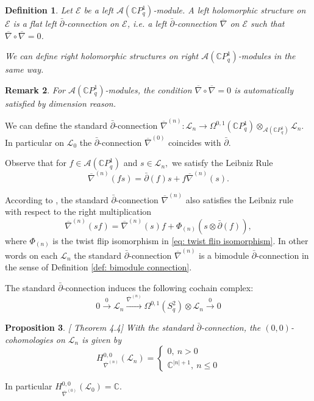 \documentclass[12pt]{article}
\newtheorem{definition}{Definition}[section]
\newtheorem{remark}[definition]{Remark}
\newtheorem{proposition}[definition]{Proposition}
\numberwithin{equation}{section}
\def\pb{\bar{\partial}}
\def\O{\Omega^{0,1}(S_q^2)}
\def\C{{\mathbb C}}
\def\A{\mathcal{A}}
\def\L{\mathcal{L}}
\begin{document}
\begin{definition}\label{def: left holomorphic structure}
    Let $\mathcal{E}$ be a left $\A(\C P^1_q)$-module. A left holomorphic structure on $\mathcal{E}$ is a flat left $\pb$-connection on $\mathcal{E}$, i.e. a left  $\pb$-connection $\overline{\nabla}$ on $\mathcal{E}$ such that $\overline{\nabla}\circ \overline{\nabla}=0$.

    We can define right holomorphic structures on right $\A(\C P^1_q)$-modules in the same way.
\end{definition}

\begin{remark}
    For $\A(\C P^1_q)$-modules, the condition $\overline{\nabla}\circ \overline{\nabla}=0$ is automatically satisfied by dimension reason.
\end{remark}



We can define the standard $\pb$-connection $\overline{\nabla}^{(n)}: \L_n \to \Omega^{0,1}(\C P^1_q)\otimes_{\mathcal{A}(\C P^1_q)}\L_n$. In particular on $\L_0$ the $\pb$-connection $\overline{\nabla}^{(0)}$ coincides with $\pb$.

Observe that for $f\in  \A(\C P^1_q)$ and $s\in \L_n,$ we satisfy the Leibniz Rule \[
\overline{\nabla}^{(n)}(fs)=\pb(f)s+f\overline{\nabla}^{(n)}(s).
\]



According to \cite[Proposition 3.7]{khalkhali2011holomorphic}, the standard $\pb$-connection $\overline{\nabla}^{(n)}$ also satisfies the Leibniz rule with respect to the right multiplication
\begin{equation}\label{eq: right Leibniz rule}
\overline{\nabla}^{(n)}(sf)=\overline{\nabla}^{(n)}(s)f+\Phi_{(n)}(s \otimes\pb(f)),
\end{equation}
where $\Phi_{(n)}$ is the twist flip isomorphism in \eqref{eq: twist flip isomorphism}. In other words on each $\L_n$ the standard $\pb$-connection $\overline{\nabla}^{(n)}$ is a bimodule $\pb$-connection in the sense of Definition \ref{def: bimodule connection}.



The standard $\pb$-connection induces the following cochain complex: \[
0 \xrightarrow{0} \L_n \xrightarrow{\overline{\nabla}^{(n)}} \O \otimes \L_n \xrightarrow{0} 0
\]


\begin{proposition}\label{prop: 0,0-th cohomology for Ln}[\cite{khalkhali2011holomorphic} Theorem 4.4]
With the standard $\pb$-connection, the $(0,0)$-cohomologies on $\L_n$ is given by
\begin{equation}
H^{0,0}_{\overline{\nabla}^{(n)}}(\L_n)=\begin{cases}0, ~n>0\\ \C ^{|n|+1},~ n\leq 0\end{cases}
\end{equation}
\end{proposition}
In particular $H^{0,0}_{\overline{\nabla}^{(0)}}(\L_0)=\C $.
\end{document}
